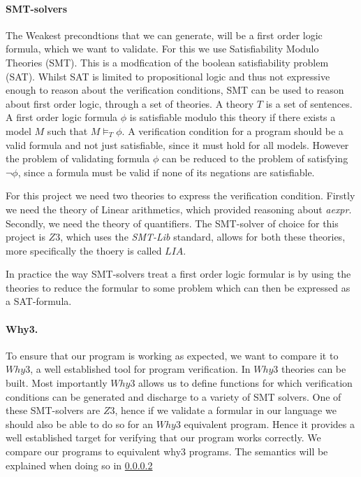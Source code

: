 \paragraph{SMT-solvers}
The Weakest precondtions that we can generate, will be a first order logic formula, which we want to validate. For this we use Satisfiability Modulo Theories (SMT).
This is a modfication of the boolean satisfiability problem (SAT).
Whilst SAT is limited to propositional logic and thus not expressive enough to reason about the verification conditions, SMT can be used to reason about first order logic, through a set of theories.
A theory $T$ is a set of sentences.
A first order logic formula $\phi$ is satisfiable modulo this theory if there exists a model $M$ such that $M \vDash_{T}\phi$. A verification condition for a program should be a valid formula and not just satisfiable, since it must hold for all models. However the problem of validating formula $\phi$ can be reduced to the problem of satisfying $\neg \phi$, since a formula must be valid if none of its negations are satisfiable.

For this project we need two theories to express the verification condition. Firstly we need the theory of Linear arithmetics, which provided reasoning about \textit{aexpr}. Secondly, we need the theory of quantifiers. The SMT-solver of choice for this project is $Z3$, which uses the \textit{SMT-Lib} standard, allows for both these theories, more specifically the thoery is called $LIA$.

In practice the way SMT-solvers treat a first order logic formular is by using the theories to reduce the formular to some problem which can then be expressed as a SAT-formula.

\paragraph{Why3.}
To ensure that our program is working as expected, we want to compare it to $Why3$, a well established tool for program verification.
In $Why3$ theories can be built. Most importantly $Why3$ allows us to define functions for which verification conditions can be generated and discharge to a variety of SMT solvers. One of these SMT-solvers are $Z3$, hence if we validate a formular in our language we should also be able to do so for an $Why3$ equivalent program. Hence it provides a well established target for verifying that our program works correctly. We compare our programs to equivalent why3 programs. The semantics will be explained when doing so in \cref{}

